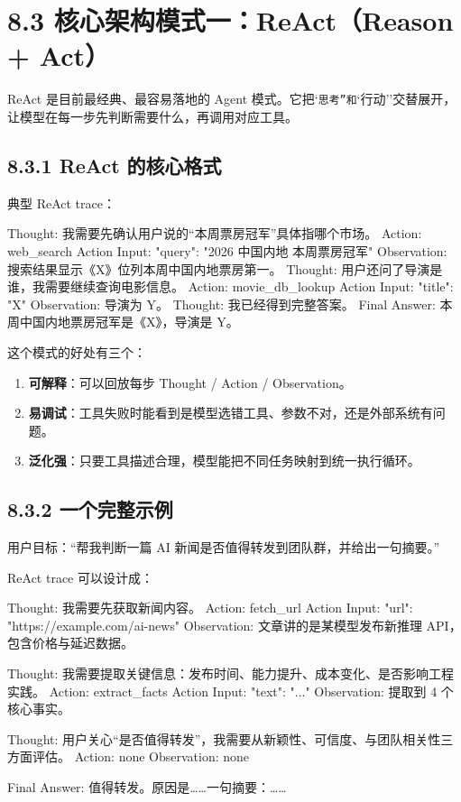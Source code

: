 \section{8.3 核心架构模式一：ReAct（Reason + Act）}

ReAct 是目前最经典、最容易落地的 Agent 模式。它把`\texttt{思考''和}`行动''交替展开，让模型在每一步先判断需要什么，再调用对应工具。


\subsection{8.3.1 ReAct 的核心格式}

典型 ReAct trace：


\begin{codeblock}
Thought: 我需要先确认用户说的``本周票房冠军''具体指哪个市场。
Action: web_search
Action Input: {"query": "2026 中国内地 本周票房冠军"}
Observation: 搜索结果显示《X》位列本周中国内地票房第一。
Thought: 用户还问了导演是谁，我需要继续查询电影信息。
Action: movie_db_lookup
Action Input: {"title": "X"}
Observation: 导演为 Y。
Thought: 我已经得到完整答案。
Final Answer: 本周中国内地票房冠军是《X》，导演是 Y。
\end{codeblock}

这个模式的好处有三个：


\begin{enumerate}[leftmargin=2em]
\item \textbf{可解释}：可以回放每步 Thought / Action / Observation。
\item \textbf{易调试}：工具失败时能看到是模型选错工具、参数不对，还是外部系统有问题。
\item \textbf{泛化强}：只要工具描述合理，模型能把不同任务映射到统一执行循环。
\end{enumerate}

\subsection{8.3.2 一个完整示例}

用户目标：``帮我判断一篇 AI 新闻是否值得转发到团队群，并给出一句摘要。''


ReAct trace 可以设计成：


\begin{codeblock}
Thought: 我需要先获取新闻内容。
Action: fetch_url
Action Input: {"url": "https://example.com/ai-news"}
Observation: 文章讲的是某模型发布新推理 API，包含价格与延迟数据。

Thought: 我需要提取关键信息：发布时间、能力提升、成本变化、是否影响工程实践。
Action: extract_facts
Action Input: {"text": "..."}
Observation: 提取到 4 个核心事实。

Thought: 用户关心``是否值得转发''，我需要从新颖性、可信度、与团队相关性三方面评估。
Action: none
Observation: none

Final Answer: 值得转发。原因是……一句摘要：……
\end{codeblock}

